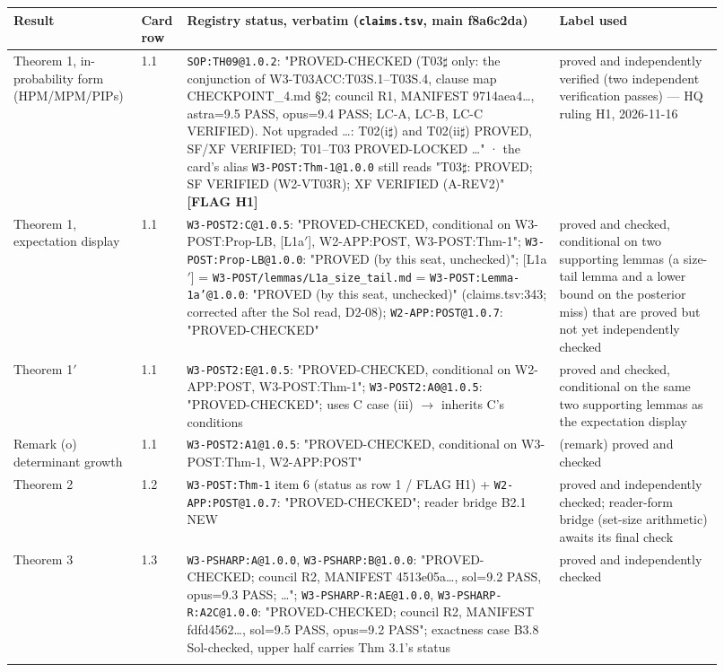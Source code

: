 \begingroup\footnotesize
\begin{longtable}{@{}p{0.15\linewidth}p{0.05\linewidth}p{0.5\linewidth}p{0.22\linewidth}@{}}
\toprule Result & Card row & Registry status, verbatim (\texttt{claims.tsv}, main f8a6c2da) & Label used \\ \midrule \endhead
Theorem 1, in-probability form (HPM/MPM/PIPs) & 1.1 & \texttt{SOP:TH09@1.0.2}: "PROVED-CHECKED (T03$\sharp$ only: the conjunction of W3-T03ACC:T03S.1--T03S.4, clause map CHECKPOINT\_4.md §2; council R1, MANIFEST 9714aea4\ldots{}, astra=9.5 PASS, opus=9.4 PASS; LC-A, LC-B, LC-C VERIFIED). Not upgraded \ldots{}: T02(i$\sharp$) and T02(ii$\sharp$) PROVED, SF/XF VERIFIED; T01--T03 PROVED-LOCKED \ldots{}" · the card's alias \texttt{W3-POST:Thm-1@1.0.0} still reads "T03$\sharp$: PROVED; SF VERIFIED (W2-VT03R); XF VERIFIED (A-REV2)" \textbf{[FLAG H1]} & proved and independently verified (two independent verification passes) --- HQ ruling H1, 2026-11-16 \\ \addlinespace
Theorem 1, expectation display & 1.1 & \texttt{W3-POST2:C@1.0.5}: "PROVED-CHECKED, conditional on W3-POST:Prop-LB, [L1a$'$], W2-APP:POST, W3-POST:Thm-1"; \texttt{W3-POST:Prop-LB@1.0.0}: "PROVED (by this seat, unchecked)"; [L1a$'$] = \texttt{W3-POST/lemmas/L1a\_size\_tail.md} = \texttt{W3-POST:Lemma-1a'@1.0.0}: "PROVED (by this seat, unchecked)" (claims.tsv:343; corrected after the Sol read, D2-08); \texttt{W2-APP:POST@1.0.7}: "PROVED-CHECKED" & proved and checked, conditional on two supporting lemmas (a size-tail lemma and a lower bound on the posterior miss) that are proved but not yet independently checked \\ \addlinespace
Theorem 1$'$ & 1.1 & \texttt{W3-POST2:E@1.0.5}: "PROVED-CHECKED, conditional on W2-APP:POST, W3-POST:Thm-1"; \texttt{W3-POST2:A0@1.0.5}: "PROVED-CHECKED"; uses C case (iii) $\to$ inherits C's conditions & proved and checked, conditional on the same two supporting lemmas as the expectation display \\ \addlinespace
Remark (o) determinant growth & 1.1 & \texttt{W3-POST2:A1@1.0.5}: "PROVED-CHECKED, conditional on W3-POST:Thm-1, W2-APP:POST" & (remark) proved and checked \\ \addlinespace
Theorem 2 & 1.2 & \texttt{W3-POST:Thm-1} item 6 (status as row 1 / FLAG H1) + \texttt{W2-APP:POST@1.0.7}: "PROVED-CHECKED"; reader bridge B2.1 NEW & proved and independently checked; reader-form bridge (set-size arithmetic) awaits its final check \\ \addlinespace
Theorem 3 & 1.3 & \texttt{W3-PSHARP:A@1.0.0}, \texttt{W3-PSHARP:B@1.0.0}: "PROVED-CHECKED; council R2, MANIFEST 4513e05a\ldots{}, sol=9.2 PASS, opus=9.3 PASS; \ldots{}"; \texttt{W3-PSHARP-R:AE@1.0.0}, \texttt{W3-PSHARP-R:A2C@1.0.0}: "PROVED-CHECKED; council R2, MANIFEST fdfd4562\ldots{}, sol=9.5 PASS, opus=9.2 PASS"; exactness case B3.8 Sol-checked, upper half carries Thm 3.1's status & proved and independently checked \\ \addlinespace

\end{longtable}
